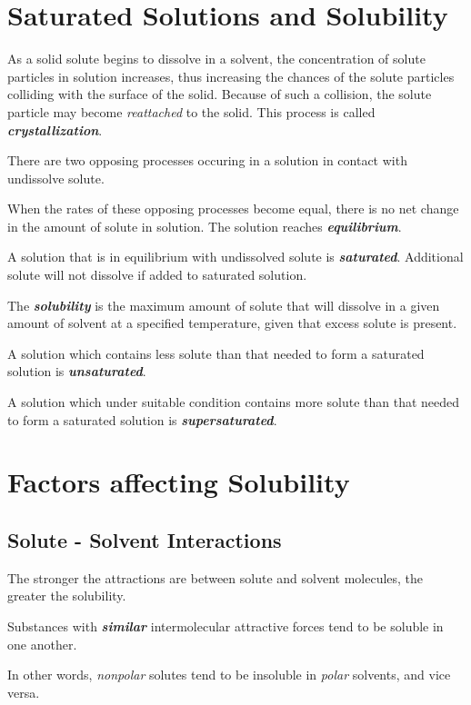 \documentclass[12pt, a4paper]{report}
\newcommand{\impt}[1]{\textbf{\textit{#1}}}
\newcommand{\hi}{\section}
\newcommand{\hii}{\subsection}
\begin{document}
\hi{Saturated Solutions and Solubility}
    \par As a solid solute begins to dissolve in a solvent, the concentration of solute
        particles in solution increases, thus increasing the chances of the solute particles
        colliding with the surface of the solid. Because of such a collision, the solute
        particle may become \textit{reattached} to the solid. This process is called
        \impt{crystallization}.
    \par There are two opposing processes occuring in a solution in contact with undissolve
        solute.
    \begin{center}
    \end{center}
    \par When the rates of these opposing processes become equal, there is no net change in
        the amount of solute in solution. The solution reaches \impt{equilibrium}.
    \par A solution that is in equilibrium with undissolved solute is \impt{saturated}.
        Additional solute will not dissolve if added to saturated solution.
    \par The \impt{solubility} is the maximum amount of solute that will dissolve in a given
        amount of solvent at a specified temperature, given that excess solute is present.
    \par A solution which contains less solute than that needed to form a saturated solution
        is \impt{unsaturated}.
    \par A solution which under suitable condition contains more solute than that needed to
        form a saturated solution is \impt{supersaturated}.

\hi{Factors affecting Solubility}
    
    \hii{Solute - Solvent Interactions}
        \par The stronger the attractions are between solute and solvent molecules, the greater
            the solubility.
        \par Substances with \impt{similar} intermolecular attractive forces tend to be soluble
            in one another.
        \par In other words, \textit{nonpolar} solutes tend to be insoluble in \textit{polar}
            solvents, and vice versa.
\end{document}
